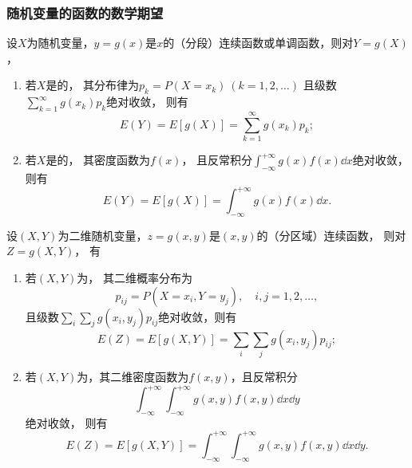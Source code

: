 \subsubsection{随机变量的函数的数学期望}
\begin{theorem}\label{theorem:随机变量的数字特征.一维随机变量的函数的数学期望}
设\(X\)为随机变量，\(y=g(x)\)是\(x\)的（分段）连续函数或单调函数，则对\(Y=g(X)\)，
\begin{enumerate}
	\item 若\(X\)是的，
	其分布律为\(p_k = P(X=x_k)\ (k=1,2,\dotsc)\)
	且级数\(\sum_{k=1}^\infty g(x_k) p_k\)绝对收敛，
	则有\[
		E(Y) = E[g(X)] = \sum_{k=1}^\infty {g(x_k) p_k};
	\]
	\item 若\(X\)是的，
	其密度函数为\(f(x)\)，
	且反常积分\(\int_{-\infty}^{+\infty} g(x) f(x) \dd{x}\)绝对收敛，
	则有\[
		E(Y) = E[g(X)] = \int_{-\infty}^{+\infty} g(x) f(x) \dd{x}.
	\]
\end{enumerate}
\end{theorem}

\begin{theorem}\label{theorem:随机变量的数字特征.二维随机变量的函数的数学期望}
设\((X,Y)\)为二维随机变量，\(z=g(x,y)\)是\((x,y)\)的（分区域）连续函数，
则对\(Z=g(X,Y)\)，
有\begin{enumerate}
	\item 若\((X,Y)\)为，
	其二维概率分布为\[
		p_{ij} = P(X=x_i,Y=y_j), \quad i,j=1,2,\dotsc,
	\]
	且级数\(\sum_i \sum_j g(x_i,y_j) p_{ij}\)绝对收敛，则有\[
		E(Z)
		= E[g(X,Y)]
		= \sum_i \sum_j g(x_i,y_j) p_{ij};
	\]
	\item 若\((X,Y)\)为，其二维密度函数为\(f(x,y)\)，且反常积分\[
		\int_{-\infty}^{+\infty} \int_{-\infty}^{+\infty} g(x,y) f(x,y) \dd{x}\dd{y}
	\]绝对收敛，
	则有\[
		E(Z)
		= E[g(X,Y)]
		= \int_{-\infty}^{+\infty} \int_{-\infty}^{+\infty} g(x,y) f(x,y) \dd{x}\dd{y}.
	\]
\end{enumerate}
\end{theorem}

